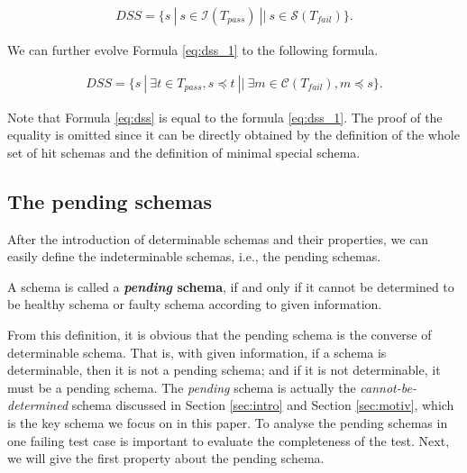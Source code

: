 \begin{equation}
\begin{aligned}\label{eq:dss_1}
DSS=\{ s\ |\ s \in  \mathcal{I}(T_{pass}) \ || \  s \in \mathcal{S}(T_{fail}) \} .
\end{aligned}
\end{equation}

We can further evolve Formula \ref{eq:dss_1} to the following formula.

\begin{equation}
\begin{aligned}\label{eq:dss}
DSS=\{ s\ |\ \exists t \in T_{pass},  s \preceq t  \ || \  \exists m \in \mathcal{C}(T_{fail}), m \preceq s \} .
\end{aligned}
\end{equation}

Note that Formula \ref{eq:dss} is equal to the formula \ref{eq:dss_1}. The proof of the equality is omitted since it can be directly obtained by the definition of the whole set of hit schemas and the definition of minimal special schema.


\subsection{The pending schemas}\label{sec:pending:pending}

After the introduction of determinable schemas and their properties, we can easily define the indeterminable schemas, i.e., the pending schemas.

\begin{definition}\label{de:pending}
A schema is called a \textbf{\emph{pending} schema}, if and only if it cannot be determined to be healthy schema or faulty schema according to given information.
\end{definition}


From this definition, it is obvious that the pending schema is the converse of determinable schema. That is, with given information, if a schema is determinable, then it is not a pending schema; and if it is not determinable, it must be a pending schema. The \emph{pending} schema is actually the \emph{cannot-be-determined} schema discussed in Section \ref{sec:intro} and Section \ref{sec:motiv}, which is the key schema we focus on in this paper. To analyse the pending schemas in one failing test case is important to evaluate the completeness of the test.  Next, we will give the first property about the pending schema.

